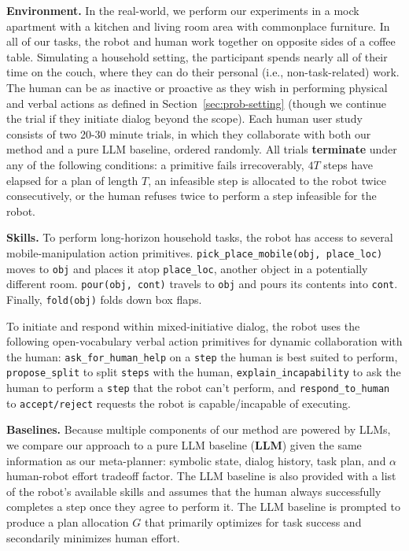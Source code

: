 \textbf{Environment.} In the real-world, we perform our experiments in a mock apartment with a kitchen and living room area with commonplace furniture. %
In all of our tasks, the robot and human work together on opposite sides of a coffee table. Simulating a household setting, the participant spends nearly all of their time on the couch, where they can do their personal (i.e., non-task-related) work. The human can be as inactive or proactive as they wish in performing physical and verbal actions as defined in Section~\ref{sec:prob-setting} (though we continue the trial if they initiate dialog beyond the scope). Each human user study consists of two 20-30 minute trials, in which they collaborate with both our method and a pure LLM baseline, ordered randomly. All trials \textbf{terminate} under any of the following conditions: a primitive fails irrecoverably, $4T$ %
steps have elapsed for a plan of length $T$, an infeasible step is allocated to the robot twice consecutively, or the human refuses twice to perform a step infeasible for the robot.

\textbf{Skills.} To perform long-horizon household tasks, the robot has access to several mobile-manipulation action primitives. \texttt{pick\_place\_mobile(obj, place\_loc)} moves to \texttt{obj} and places it atop \texttt{place\_loc}, another object in a potentially different room. \texttt{pour(obj, cont)} travels to \texttt{obj} and pours its contents into \texttt{cont}. Finally, \texttt{fold(obj)} folds down box flaps.

To initiate and respond within mixed-initiative dialog, the robot uses the following open-vocabulary verbal action primitives for dynamic collaboration with the human: \texttt{ask\_for\_human\_help} on a \texttt{step} the human is best suited to perform, \texttt{propose\_split} to split \texttt{steps} with the human, \texttt{explain\_incapability} to ask the human to perform a \texttt{step} that the robot can't perform, and \texttt{respond\_to\_human} to \texttt{accept/reject} requests the robot is capable/incapable of executing.

\textbf{Baselines.} Because multiple components of our method are powered by LLMs, we compare our approach to a pure LLM baseline (\textbf{LLM}) given the same information as our meta-planner: symbolic state, dialog history, task plan, and $\alpha$ human-robot effort tradeoff factor. The LLM baseline is also provided with a list of the robot’s available skills and assumes that the human always successfully completes a step once they agree to perform it. The LLM baseline is prompted to produce a plan allocation $G$ that primarily optimizes for task success and secondarily minimizes human effort.

